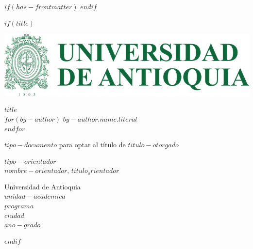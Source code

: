 
$if(has-frontmatter)$
\frontmatter
$endif$

$if(title)$
\cleardoublepage

\thispagestyle{empty}

{\centering

\includegraphics{assets/escudo_udea.png}

\vspace{2cm}
{\bfseries $title$}\\[2cm]

\vspace{2cm}
$for(by-author)$
{$by-author.name.literal$}\\
$endfor$

\vspace{2cm}
{$tipo-documento$ para optar al título de $titulo-otorgado$}

\vspace{2cm}
{$tipo-orientador$}\\
{$nombre-orientador$, $titulo_orientador$}

\vspace{1cm}
{Universidad de Antioquia}\\
{$unidad-academica$}\\
{$programa$}\\
{$ciudad$}\\
{$ano-grado$}

}
$endif$
\newpage


